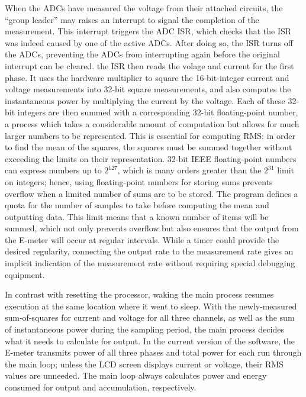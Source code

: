 When the \acp{ADC} have measured the voltage from their attached
circuits, the ``group leader'' may raises an interrupt to signal the
completion of the measurement. This interrupt triggers the \ac{ADC}
\ac{ISR}, which checks that the \ac{ISR} was indeed caused by one of
the active \acp{ADC}. After doing so, the \ac{ISR} turns off
the \acp{ADC}, preventing the \acp{ADC} from interrupting again before
the original interrupt can be cleared. the \ac{ISR} then reads the
volage and current for the first phase. It uses the hardware
multiplier to square the 16-bit-integer current and voltage
measurements into 32-bit square measurements, and also computes the
instantaneous power by multiplying the current by the voltage. Each of
these 32-bit integers are then summed with a corresponding 32-bit
floating-point number, a process which takes a considerable amount of
computation but allows for much larger numbers to be
represented. This is essential for computing RMS: in order to find the
mean of the squares, the squares must be summed together without
exceeding the limits on their representation. 32-bit \ac{IEEE} floating-point
numbers can express numbers up to $2^{127}$, which is many orders
greater than the $2^{31}$ limit on integers; hence, using
floating-point numbers for storing sums prevents overflow when a
limited number of sums are to be stored. The program defines a quota
for the number of samples to take before computing the mean and
outputting data. This limit means that a known number of items will be
summed, which not only prevents overflow but also ensures that the
output from the E-meter will occur at regular intervals. While a timer
could provide the desired regularity, connecting the output rate to
the measurement rate gives an implicit indication of the measurement
rate without requiring special debugging equipment.

In contrast with resetting the processor, waking the main process
resumes execution at the same location where it went to sleep. With
the newly-measured sum-of-squares for current and voltage for all
three channels, as well as the sum of instantaneous power during the
sampling period, the main process decides what it needs to calculate
for output. In the current version of the software, the E-meter
transmits power of all three phases and total power for each run
through the main loop; unless the \ac{LCD} screen displays current or
voltage, their \ac{RMS} values are unneeded. The main loop always
calculates power and energy consumed for output and accumulation,
respectively.


